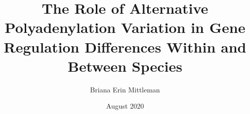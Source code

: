 \documentclass{ucetd}
\title{The Role of Alternative Polyadenylation Variation in Gene Regulation Differences Within and Between Species}
\author{Briana Erin Mittleman}
\date{August 2020}
\begin{document}
\maketitle

\makecopyright


\tableofcontents
\listoffigures
\listoftables





\mainmatter












\makebibliography

%
%
\end{document}
